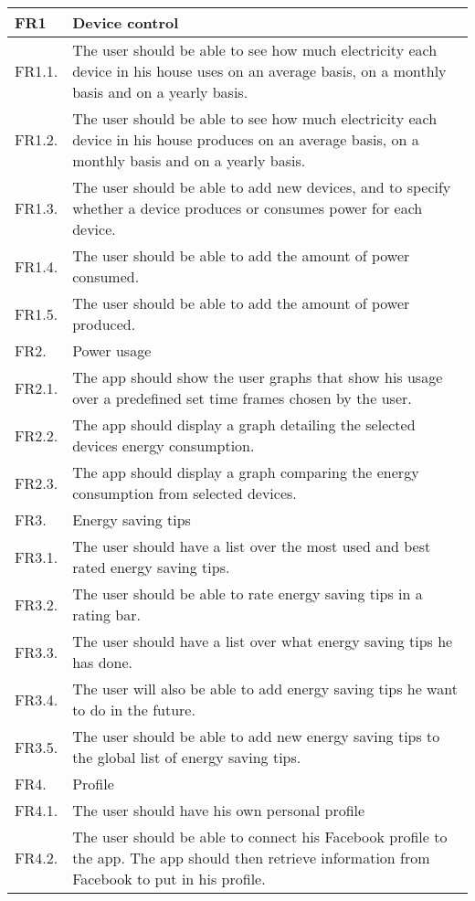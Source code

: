 \begin{longtable}{|l|p{14.5cm}|}
\hline
\cellcolor{lightgray}FR1 & \cellcolor{lightgray}Device control\\\hline
FR1.1. &The user should be able to see how much electricity each device in his house uses on an average basis, on a monthly basis and on a yearly basis.\\\hline
FR1.2. &The user should be able to see how much electricity each device in his house produces on an average basis, on a monthly basis and on a yearly basis.\\\hline
FR1.3. &The user should be able to add new devices, and to specify whether a device produces or consumes power for each device.\\\hline
 FR1.4. &The user should be able to add the amount of power consumed.\\\hline
FR1.5.& The user should be able to add the amount of power produced.\\\hline
\cellcolor{lightgray}FR2. &\cellcolor{lightgray}Power usage\\\hline
FR2.1.& The app should show the user graphs that show his usage over a predefined set time frames chosen by the user.\\\hline
FR2.2.& The app should display a graph detailing the selected devices energy consumption.\\\hline
FR2.3.& The app should display a graph comparing the energy consumption from selected devices.\\\hline
\cellcolor{lightgray}FR3. &\cellcolor{lightgray}Energy saving tips\\\hline
FR3.1. &The user should have a list over the most used and best rated energy saving tips.\\\hline
FR3.2. &The user should be able to rate energy saving tips in a rating bar.\\\hline
FR3.3. &The user should have a list over what energy saving tips he has done.\\\hline
FR3.4.& The user will also be able to add energy saving tips he want to do in the future.\\\hline
FR3.5.& The user should be able to add new energy saving tips to the global list of energy saving tips.\\\hline
\cellcolor{lightgray}FR4.& \cellcolor{lightgray}Profile\\\hline
FR4.1.& The user should have his own personal profile\\\hline
FR4.2.& The user should be able to connect his Facebook profile to the app. The app should then retrieve information from Facebook to put in his profile.\\\hline

\end{longtable}
